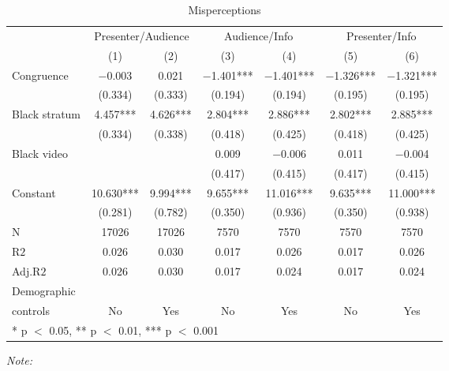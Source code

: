\begin{table}[!h]

\caption{Misperceptions\label{tab:main1}}
\centering
\begin{threeparttable}
\begin{tabular}[t]{lcccccc}
\toprule
\multicolumn{1}{c}{ } & \multicolumn{2}{c}{Presenter/Audience} & \multicolumn{2}{c}{Audience/Info} & \multicolumn{2}{c}{Presenter/Info} \\
\cmidrule(l{3pt}r{3pt}){2-3} \cmidrule(l{3pt}r{3pt}){4-5} \cmidrule(l{3pt}r{3pt}){6-7}
  & (1) & (2) & (3) & (4) & (5) & (6)\\
\midrule
Congruence & \num{-0.003} & \num{0.021} & \num{-1.401}*** & \num{-1.401}*** & \num{-1.326}*** & \num{-1.321}***\\
 & (\num{0.334}) & (\num{0.333}) & (\num{0.194}) & (\num{0.194}) & (\num{0.195}) & (\num{0.195})\\
Black stratum & \num{4.457}*** & \num{4.626}*** & \num{2.804}*** & \num{2.886}*** & \num{2.802}*** & \num{2.885}***\\
 & (\num{0.334}) & (\num{0.338}) & (\num{0.418}) & (\num{0.425}) & (\num{0.418}) & (\num{0.425})\\
Black video &  &  & \num{0.009} & \num{-0.006} & \num{0.011} & \num{-0.004}\\
 &  &  & (\num{0.417}) & (\num{0.415}) & (\num{0.417}) & (\num{0.415})\\
Constant & \num{10.630}*** & \num{9.994}*** & \num{9.655}*** & \num{11.016}*** & \num{9.635}*** & \num{11.000}***\\
 & (\num{0.281}) & (\num{0.782}) & (\num{0.350}) & (\num{0.936}) & (\num{0.350}) & (\num{0.938})\\
\midrule
N & \num{17026} & \num{17026} & \num{7570} & \num{7570} & \num{7570} & \num{7570}\\
R$2$ & \num{0.026} & \num{0.030} & \num{0.017} & \num{0.026} & \num{0.017} & \num{0.026}\\
Adj.R$2$ & \num{0.026} & \num{0.030} & \num{0.017} & \num{0.024} & \num{0.017} & \num{0.024}\\
Demographic\\controls & No & Yes & No & Yes & No & Yes\\
\bottomrule
\multicolumn{7}{l}{\rule{0pt}{1em}* p $<$ 0.05, ** p $<$ 0.01, *** p $<$ 0.001}\\
\end{tabular}
\begin{tablenotes}[para]
\item \textit{Note: } 

\end{tablenotes}
\end{threeparttable}
\end{table}
